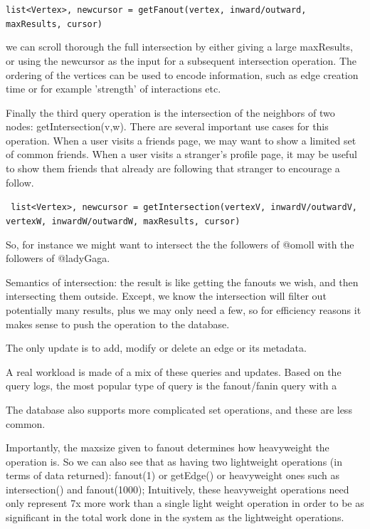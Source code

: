 \documentclass[11pt]{article}
\begin{document}
\verb!list<Vertex>, newcursor = getFanout(vertex, inward/outward, maxResults, cursor)!

 we can scroll thorough the full intersection by either giving a large maxResults, or using the newcursor as the input for a subsequent intersection operation. The ordering of the vertices can be used to encode information, such as edge creation time or for example 'strength' of interactions etc.


Finally the third query operation is the intersection of the neighbors of two nodes: getIntersection(v,w).
There are several important use cases for this operation. When a user visits a friends page, we may want to show a limited set of common friends.  When a user visits a stranger's profile page, it may be useful to show them friends that already are following that stranger to encourage a follow.


\verb! list<Vertex>, newcursor = getIntersection(vertexV, inwardV/outwardV, vertexW, inwardW/outwardW, maxResults, cursor)!

So, for instance we might want to intersect the the followers of @omoll with the followers of @ladyGaga.

Semantics of intersection: the result is like getting the fanouts we wish, and then intersecting them outside. Except, we know the intersection will filter out potentially many results, plus we may only need a few, so for efficiency reasons it makes sense to push the operation to the database.

The only update is to add, modify or delete an edge or its metadata. 


A real workload is made of a mix of these queries and updates. Based on the query logs, the most popular type of query is the fanout/fanin query with a 


The database also supports more complicated set operations, and these are less common.

Importantly, the maxsize given to fanout determines how heavyweight the operation is. So we can also see that
as having two lightweight operations (in terms of data returned): fanout(1) or getEdge() or heavyweight ones such as
intersection() and fanout(1000); Intuitively, these heavyweight operations need only represent 7x more work than a single light weight operation in order to be as significant in the total work done in the system as the lightweight operations.
\end{document}
